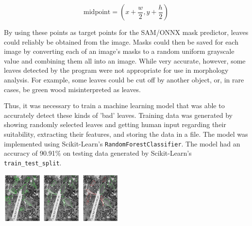 \documentclass[final,5p,times,twocolumn,authoryear]{elsarticle}
\begin{document}
\begin{equation}
    \mbox{midpoint} = (x + \frac{w}{2}, y + \frac{h}{2})
\end{equation}

By using these points as target points for the SAM/ONNX mask predictor, leaves could reliably be obtained from the image. Masks could then be saved for each image by converting each of an image's masks to a random uniform grayscale value and combining them all into an image. While very accurate, however, some leaves detected by the program were not appropriate for use in morphology analysis. For example, some leaves could be cut off by another object, or, in rare cases, be green wood misinterpreted as leaves.

Thus, it was necessary to train a machine learning model that was able to accurately detect these kinds of 'bad' leaves. Training data was generated by showing randomly selected leaves and getting human input regarding their suitability, extracting their features, and storing the data in a file. The model was implemented using Scikit-Learn's \verb|RandomForestClassifier|. The model had an accuracy of 90.91\% on testing data generated by Scikit-Learn's \verb|train_test_split|.

\begin{center}
	\centering
	\includegraphics[width=0.15\textwidth]{images/seg_pipeline/6.png}	
        \includegraphics[width=0.15\textwidth]{images/seg_filter/1.png}      	\includegraphics[width=0.15\textwidth]{images/seg_filter/2.png}	
\end{center}
\end{document}
